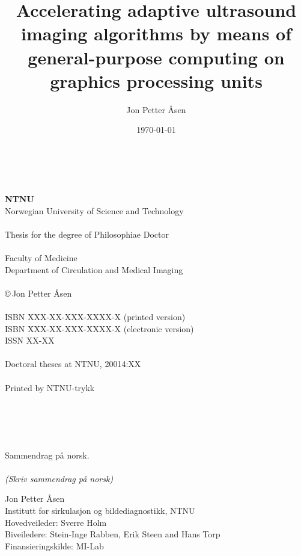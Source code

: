 \documentclass[10pt,b5paper,twoside]{book}
\author{Jon Petter \AA{}sen}
\title{%
Accelerating adaptive ultrasound imaging algorithms by means of general-purpose computing on graphics processing units 
\vspace{0.5cm}}
\newcommand\todo[1]{{\textit{\color{red}(#1)}}}
\begin{document}
\date{\today}
\pagestyle{empty} \maketitle

\newpage%

\renewcommand{\thepage}{\roman{page}}%

~\\
\vspace{10.0cm}
~\\
{\bf NTNU}
\\
Norwegian University of Science and Technology\\
\\
Thesis for the degree of Philosophiae Doctor\\
\\
Faculty of Medicine\\
Department of Circulation and Medical Imaging\\
\\
\copyright\,Jon Petter \AA{}sen\\
\\
ISBN XXX-XX-XXX-XXXX-X (printed version)\\
ISBN XXX-XX-XXX-XXXX-X (electronic version)\\
ISSN XX-XX\\
\\
Doctoral theses at NTNU, 20014:XX\\
\\
Printed by NTNU-trykk

~\\
\newpage
~\\%
~\\%
~\\
\noindent\large 
Sammendrag p\aa{} norsk.
\\\\%
\normalsize
\todo{Skriv sammendrag p\aa{} norsk}

\vspace{0.3cm}
\noindent Jon Petter \AA{}sen\\
Institutt for sirkulasjon og bildediagnostikk, NTNU\\
Hovedveileder: Sverre Holm\\ 
Biveiledere: Stein-Inge Rabben, Erik Steen and Hans Torp\\
Finansieringskilde: MI-Lab
\end{document}
